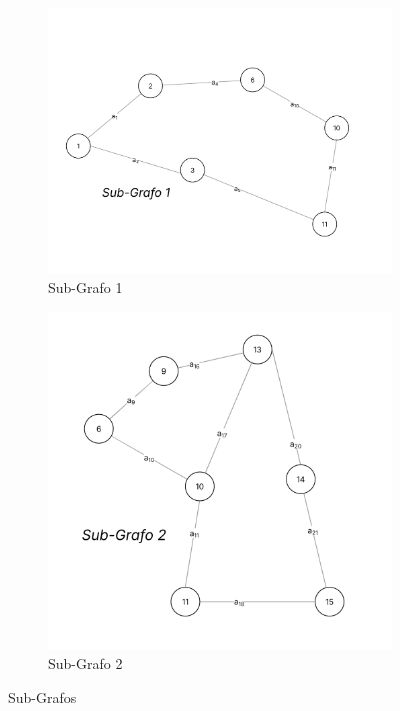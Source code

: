 \documentclass[
12pt,
a4paper,
semrecuonosumario,
sumario = abnt-6027-2012]{report}
\begin{document}
\begin{figure}[!htb]
            \begin{subfigure}[b]{0.48\textwidth}
                \centering
                \includegraphics[width=\textwidth]{figuras/subgrafos/subgrafo1.png} %
                \caption{Sub-Grafo 1}
                \label{fig:imagem1}
            \end{subfigure}
            \hfill %
            \begin{subfigure}[b]{0.48\textwidth}
                \centering
                \includegraphics[width=\textwidth]{figuras/subgrafos/subgrafo2.png} %
                \caption{Sub-Grafo 2}
                \label{fig:imagem2}
            \end{subfigure}

            \caption{Sub-Grafos}
            \label{fig:duasFiguras}
        \end{figure}
\end{document}
